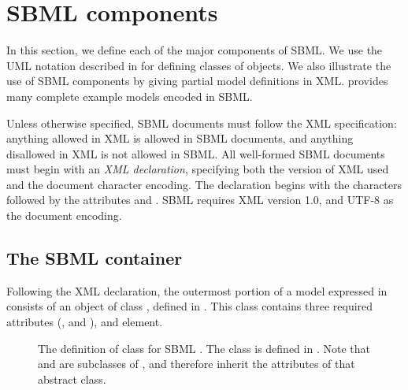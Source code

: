 
\section{SBML components}
\label{sec:elements}

In this section, we define each of the major components of SBML.
We use the UML notation described in
 for defining classes of objects.
We also illustrate the use of SBML components by giving partial
model definitions in XML.   provides many
complete example models encoded in SBML.

Unless otherwise specified, SBML \thisL documents must follow the XML specification:  anything allowed in XML is allowed in SBML documents, and anything disallowed in XML is not allowed in SBML.
All well-formed SBML documents must begin with an \emph{XML
  declaration}, specifying both the version of XML used
and the document character encoding.  The declaration begins with
the characters  followed by the attributes 
and .  SBML requires XML version 1.0, and UTF-8 as the document encoding.

\subsection{The SBML container}
\label{sec:sbml}

Following the XML
declaration, the outermost portion of a model expressed in \thisL
consists of an object of class \SBML, defined in
.  This class contains three required
attributes (,  and ), and
  element.

\begin{figure}[htb]
  \vspace{-3ex}
  \centering
  \small
  \vspace{1.5ex}
  \caption{The definition of class \SBML for SBML \thisLV.  The
    class \Model is defined in .  Note that
    \SBML and \Model are subclasses of \SBaseUpright, and therefore
    inherit the attributes of that abstract class.}
  \label{fig:sbml}
\end{figure}

